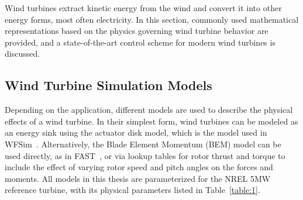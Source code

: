 Wind turbines extract kinetic energy from the wind and convert it into other energy forms, most often electricity. In this section, commonly used mathematical representations based on the physics governing wind turbine behavior are provided, and a state-of-the-art control scheme for modern wind turbines is discussed.

\subsection{Wind Turbine Simulation Models}\label{windTurbineModel}
Depending on the application, different models are used to describe the physical effects of a wind turbine. In their simplest form, wind turbines can be modeled as an energy sink using the actuator disk model, which is the model used in WFSim~\cite{boersma2018control}. Alternatively, the Blade Element Momentum (BEM) model can be used directly, as in FAST~\cite{jonkman2005fast}, or via lookup tables for rotor thrust and torque to include the effect of varying rotor speed and pitch angles on the forces and moments. All models in this thesis are parameterized for the NREL 5MW reference 
turbine, with its physical parameters listed in Table~\ref{table:1}.


